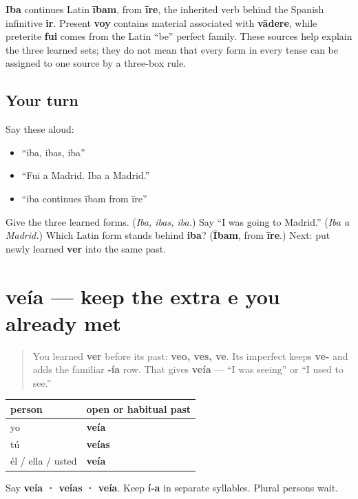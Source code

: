 \begin{cousinweb}
\textbf{Iba} continues Latin \textbf{ībam}, from \textbf{īre}, the inherited verb behind the Spanish infinitive \textbf{ir}. Present \textbf{voy} contains material associated with \textbf{vādere}, while preterite \textbf{fui} comes from the Latin “be” perfect family. These sources help explain the three learned sets; they do not mean that every form in every tense can be assigned to one source by a three-box rule.
\end{cousinweb}

\subsection*{Your turn}
Say these aloud:

\begin{itemize}
\raggedright
  \item “iba, ibas, iba”
  \item “Fui a Madrid. Iba a Madrid.”
  \item “iba continues ībam from īre”
\end{itemize}

\begin{tcolorbox}[breakable,colback=teal!4,colframe=teal!35!black,title={Before you move on}]
Give the three learned forms. (\emph{Iba, ibas, iba.}) Say “I was going to Madrid.” (\emph{Iba a Madrid.}) Which Latin form stands behind \textbf{iba}? (\textbf{Ībam}, from \textbf{īre}.) Next: put newly learned \textbf{ver} into the same past.
\end{tcolorbox}
\section[veía]{veía — keep the extra e you already met}

\label{lesson:ES-C16-ver-imperfecto}



\begin{quote}
You learned \textbf{ver} before its past: \textbf{veo, ves, ve}. Its imperfect keeps \textbf{ve-} and adds the familiar \textbf{-ía} row. That gives \textbf{veía} — “I was seeing” or “I used to see.”
\end{quote}

\begin{grammarlens}[title={Grammar Lens: the singular ver row}]
\noindent
\begin{tabularx}{\linewidth}{@{}>{\raggedright\arraybackslash}X>{\raggedright\arraybackslash}X@{}}
\toprule
\textbf{person} & \textbf{open or habitual past} \\
\midrule
yo & \textbf{veía} \\
tú & \textbf{veías} \\
él / ella / usted & \textbf{veía} \\
\bottomrule
\end{tabularx}

Say \textbf{veía · veías · veía}. Keep \textbf{í-a} in separate syllables. Plural persons wait.
\end{grammarlens}

